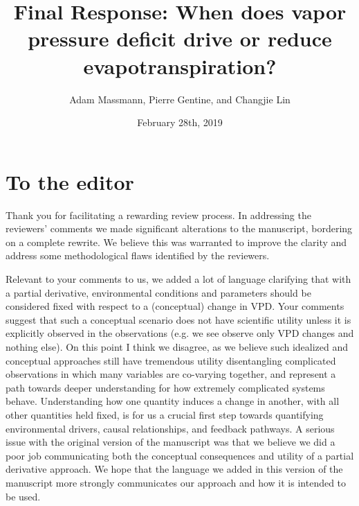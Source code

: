 \documentclass[12pt]{article}
\title{Final Response: When does vapor pressure deficit drive or
  reduce evapotranspiration?}
\author{Adam Massmann, Pierre Gentine, and Changjie Lin}
\date{February 28th, 2019}
\begin{document}
\section{To the editor}

Thank you for facilitating a rewarding review process. In addressing
the reviewers' comments we made significant alterations to the
manuscript, bordering on a complete rewrite. We believe this was
warranted to improve the clarity and address some methodological flaws
identified by the reviewers.

Relevant to your comments to us, we added a lot of language clarifying
that with a partial derivative, environmental conditions and parameters
should be considered fixed with respect to a (conceptual) change in
VPD. Your comments suggest that such a conceptual scenario does not
have scientific utility unless it is explicitly observed in the
observations (e.g. we see observe only VPD changes and nothing
else). On this point I think we disagree, as we believe such idealized
and conceptual approaches still have tremendous utility disentangling
complicated observations in which many variables are co-varying
together, and represent a path towards deeper understanding for how
extremely complicated systems behave. Understanding how one quantity
induces a change in another, with all other quantities held fixed, is
for us a crucial first step towards quantifying environmental drivers,
causal relationships, and feedback pathways. A serious issue with the
original version of the manuscript was that we believe we did a poor
job communicating both the conceptual consequences and utility of a
partial derivative approach. We hope that the language we added in
this version of the manuscript more strongly communicates our approach
and how it is intended to be used.
\end{document}
